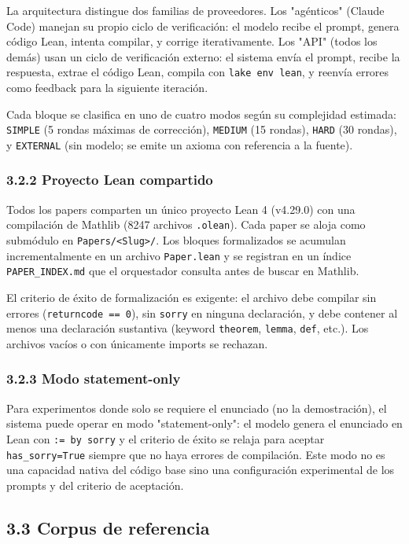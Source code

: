 \documentclass[12pt,a4paper]{article}
\theoremstyle{remark}
\begin{document}
La arquitectura distingue dos familias de proveedores. Los "agénticos" (Claude Code) manejan su propio ciclo de verificación: el modelo recibe el prompt, genera código Lean, intenta compilar, y corrige iterativamente. Los "API" (todos los demás) usan un ciclo de verificación externo: el sistema envía el prompt, recibe la respuesta, extrae el código Lean, compila con \texttt{lake env lean}, y reenvía errores como feedback para la siguiente iteración.


Cada bloque se clasifica en uno de cuatro modos según su complejidad estimada: \texttt{SIMPLE} (5 rondas máximas de corrección), \texttt{MEDIUM} (15 rondas), \texttt{HARD} (30 rondas), y \texttt{EXTERNAL} (sin modelo; se emite un axioma con referencia a la fuente).


\subsubsection{3.2.2 Proyecto Lean compartido}

Todos los papers comparten un único proyecto Lean 4 (v4.29.0) con una compilación de Mathlib (8247 archivos \texttt{.olean}). Cada paper se aloja como submódulo en \texttt{Papers/<Slug>/}. Los bloques formalizados se acumulan incrementalmente en un archivo \texttt{Paper.lean} y se registran en un índice \texttt{PAPER\_INDEX.md} que el orquestador consulta antes de buscar en Mathlib.


El criterio de éxito de formalización es exigente: el archivo debe compilar sin errores (\texttt{returncode == 0}), sin \texttt{sorry} en ninguna declaración, y debe contener al menos una declaración sustantiva (keyword \texttt{theorem}, \texttt{lemma}, \texttt{def}, etc.). Los archivos vacíos o con únicamente imports se rechazan.


\subsubsection{3.2.3 Modo statement-only}

Para experimentos donde solo se requiere el enunciado (no la demostración), el sistema puede operar en modo "statement-only": el modelo genera el enunciado en Lean con \texttt{:= by sorry} y el criterio de éxito se relaja para aceptar \texttt{has\_sorry=True} siempre que no haya errores de compilación. Este modo no es una capacidad nativa del código base sino una configuración experimental de los prompts y del criterio de aceptación.


\subsection{3.3 Corpus de referencia}
\end{document}
